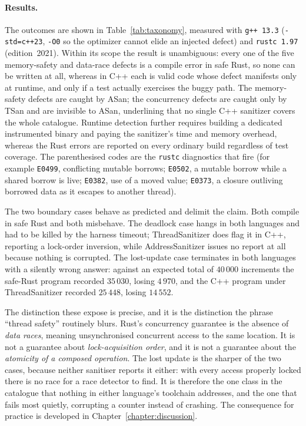 \documentclass[english,twoside,openright,a4paper,censored,csm,software-track-2020]{HYthesisML}
\begin{document}
\paragraph{Results.}
The outcomes are shown in Table~\ref{tab:taxonomy}, measured with \texttt{g++~13.3}
(\texttt{-std=c++23}, \texttt{-O0} so the optimizer cannot elide an injected defect) and
\texttt{rustc~1.97} (edition~2021). Within its scope the result is unambiguous: every one of
the five memory-safety and data-race defects is a compile error in safe Rust, so none can be
written at all, whereas in C++ each is valid code whose defect manifests only at runtime, and
only if a test actually exercises the buggy path. The memory-safety defects are caught by ASan;
the concurrency defects are caught only by TSan and are invisible to ASan, underlining that no
single C++ sanitizer covers the whole catalogue. Runtime detection further requires building a
dedicated instrumented binary and paying the sanitizer's time and memory overhead, whereas the
Rust errors are reported on every ordinary build regardless of test coverage. The parenthesised
codes are the \texttt{rustc} diagnostics that fire (for example \texttt{E0499}, conflicting
mutable borrows; \texttt{E0502}, a mutable borrow while a shared borrow is live; \texttt{E0382},
use of a moved value; \texttt{E0373}, a closure outliving borrowed data as it escapes to another
thread).

The two boundary cases behave as predicted and delimit the claim. Both compile in safe Rust and
both misbehave. The deadlock case hangs in both languages and had to be killed by the harness
timeout; ThreadSanitizer does flag it in C++, reporting a lock-order inversion, while
AddressSanitizer issues no report at all because nothing is corrupted. The lost-update case
terminates in both languages with a silently wrong answer: against an expected total of
$40\,000$ increments the safe-Rust program recorded $35\,030$, losing $4\,970$, and the C++
program under ThreadSanitizer recorded $25\,448$, losing $14\,552$.

The distinction these expose is precise, and it is the distinction the phrase ``thread safety''
routinely blurs. Rust's concurrency guarantee is the absence of \emph{data races}, meaning
unsynchronised concurrent access to the same location. It is not a guarantee about
\emph{lock-acquisition order}, and it is not a guarantee about the \emph{atomicity of a composed
operation}. The lost update is the sharper of the two cases, because neither sanitiser reports
it either: with every access properly locked there is no race for a race detector to find. It
is therefore the one class in the catalogue that nothing in either language's toolchain
addresses, and the one that fails most quietly, corrupting a counter instead of crashing. The
consequence for practice is developed in Chapter~\ref{chapter:discussion}.
\end{document}
